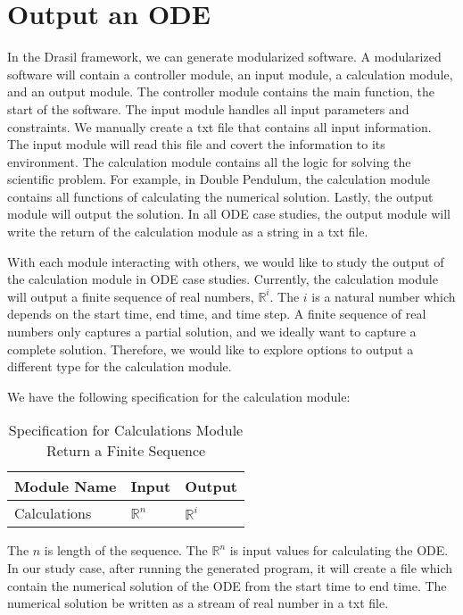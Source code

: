 \section{Output an ODE}
In the Drasil framework, we can generate modularized software. A modularized software will contain a controller module, an input module, a calculation module, and an output module. The controller module contains the main function, the start of the software. The input module handles all input parameters and constraints. We manually create a txt file that contains all input information. The input module will read this file and covert the information to its environment. The calculation module contains all the logic for solving the scientific problem. For example, in Double Pendulum, the calculation module contains all functions of calculating the numerical solution. Lastly, the output module will output the solution. In all ODE case studies, the output module will write the return of the calculation module as a string in a txt file. 

With each module interacting with others, we would like to study the output of the calculation module in ODE case studies. Currently, the calculation module will output a finite sequence of real numbers, $\mathbb{R}^i$. The $i$ is a natural number which depends on the start time, end time, and time step. A finite sequence of real numbers only captures a partial solution, and we ideally want to capture a complete solution. Therefore, we would like to explore options to output a different type for the calculation module. 

We have the following specification for the calculation module:

\begin{table}[ht]
\centering
\begin{tabular}{p{} | p{} | p{}} \hline
    \textbf{Module Name}&\textbf{Input}&\textbf{Output}\\
    \toprule
    Calculations & $\mathbb{R}^n$ & $\mathbb{R}^i$ \\
    \bottomrule	
\end{tabular}	
\caption{Specification for Calculations Module Return a Finite Sequence}	
\label{tab_srsforcal}
\end{table}
The $n$ is length of the sequence. The $\mathbb{R}^n$ is input values for calculating the ODE. In our study case, after running the generated program, it will create a file which contain the numerical solution of the ODE from the start time to end time. The numerical solution be written as a stream of real number in a txt file.

